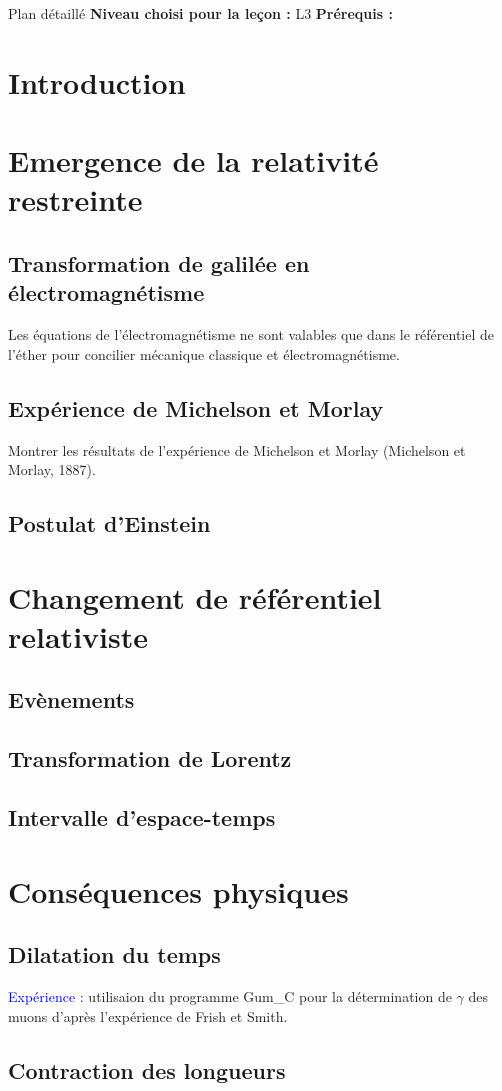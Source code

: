 \begin{reportBlock}{Plan détaillé}
  \textbf{Niveau choisi pour la leçon :} L3
  \newline
  \textbf{Prérequis : }
  \newline

\section*{Introduction}

\section{Emergence de la relativité restreinte}

\subsection{Transformation de galilée en électromagnétisme}
Les équations de l'électromagnétisme ne sont valables que dans le référentiel de l'éther pour concilier mécanique classique et électromagnétisme.
\subsection{Expérience de Michelson et Morlay}
Montrer les résultats de l'expérience de Michelson et Morlay (Michelson et Morlay, 1887). 

\subsection{Postulat d'Einstein}

\section{Changement de référentiel relativiste}

\subsection{Evènements}

\subsection{Transformation de Lorentz}

\subsection{Intervalle d'espace-temps}

\section{Conséquences physiques}
\subsection{Dilatation du temps}
\textcolor{blue}{Expérience :} utilisaion du programme Gum\_C pour la détermination de $\gamma$ des muons d'après l'expérience de Frish et Smith.
\subsection{Contraction des longueurs}

\end{reportBlock}